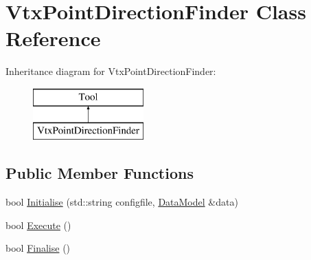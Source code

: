 \hypertarget{classVtxPointDirectionFinder}{\section{Vtx\-Point\-Direction\-Finder Class Reference}
\label{classVtxPointDirectionFinder}
}
Inheritance diagram for Vtx\-Point\-Direction\-Finder\-:\begin{figure}[H]
\begin{center}
\leavevmode
\includegraphics[height=2.000000cm]{classVtxPointDirectionFinder}
\end{center}
\end{figure}
\subsection*{Public Member Functions}
\begin{DoxyCompactItemize}
\item 
bool \hyperlink{classVtxPointDirectionFinder_aa95039075c595e8fc3d873158036ea1f}{Initialise} (std\-::string configfile, \hyperlink{classDataModel}{Data\-Model} \&data)
\item 
bool \hyperlink{classVtxPointDirectionFinder_a8db18f92b7ae99392c7615131b929676}{Execute} ()
\item 
bool \hyperlink{classVtxPointDirectionFinder_a4dd5a07dc9b778c3bf633ba21f75792d}{Finalise} ()
\end{DoxyCompactItemize}



